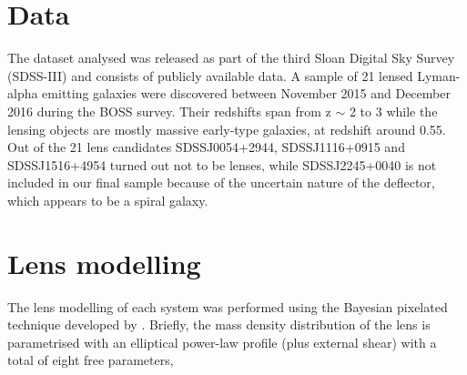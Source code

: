 \documentclass[a4paper,fleqn,usenatbib]{mnras}
\begin{document}
\section{Data}
The dataset analysed was released as part of the third Sloan Digital Sky Survey (SDSS-III) and consists of publicly available data. A sample of 21 lensed Lyman-alpha emitting galaxies were discovered between November 2015 and December 2016 during the BOSS survey. Their redshifts span from z $\sim$ 2 to 3 while the lensing objects are mostly massive early-type galaxies, at redshift around 0.55. Out of the 21 lens candidates SDSSJ0054+2944, SDSSJ1116+0915 and SDSSJ1516+4954 turned out not to be lenses, while SDSSJ2245+0040 is not included in our final sample because of the uncertain nature of the deflector, which appears to be a spiral galaxy.


\section{Lens modelling}
The lens modelling of each system was performed using the Bayesian pixelated technique developed by \citet{V09}.
Briefly, the mass density distribution of the lens is parametrised with an elliptical power-law profile (plus external shear) with a total of eight free parameters,
\end{document}
